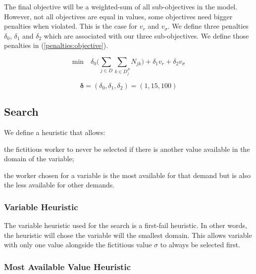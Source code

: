 \documentclass[../../thesis.tex]{subfiles}
\begin{document}
The final objective will be a weighted-sum of all sub-objectives in the model. However, not all objectives are equal 
in values, some objectives need bigger penalties when violated. This is the case for $v_r$ and $v_{\sigma}$.
We define three penalties $\delta_0$, $\delta_1$ and $\delta_2$ which are associated with our three sub-objectives.
We define those penalties in (\ref{penalties:objective}).

\begin{equation}
  \text{min} \quad \delta_0 \big( \sum_{j \in D} \sum_{k \in D^P_j} N_{jk} \big) + \delta_1 v_r + \delta_2 v_{\sigma} \label{cp:objective}
\end{equation}

\begin{equation}
  \label{penalties:objective}
  \bm{\delta} = (\delta_0, \delta_1, \delta_2) = (1, 15, 100)
\end{equation}




\subsection{Search}

We define a heuristic that allows:
\begin{enumerate*}[label=(\roman*)]
  \item the fictitious worker to never be selected if there is another value available in the domain of the variable;
  \item the worker chosen for a variable is the most available for that demand but is also the less available for other demands.
\end{enumerate*}

\subsubsection{Variable Heuristic}

The variable heuristic used for the search is a first-fail heuristic. In other words, the heuristic 
will chose the variable will the smallest domain. This allows variable with only one value alongside the 
fictitious value $\sigma$ to always be selected first.

\subsubsection{Most Available Value Heuristic}
\end{document}
